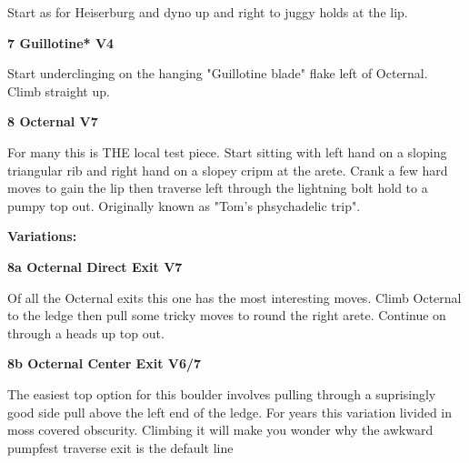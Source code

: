 \begin{multicols}{2}
\begin{adjustwidth}{0.5cm}{}
\begin{adjustwidth}{0.5cm}{}			
Start as for Heiserburg and dyno up and right to juggy holds at the lip.
\end{adjustwidth}


\end{adjustwidth}


\needspace{1.5cm}
\label{rt:Guillotine}
\colorbox{RoyalBlue!20}{
\parbox{0.95\linewidth}{
\textbf{
7 Guillotine* V4  
}}}

\begin{adjustwidth}{0.5cm}{}			
Start underclinging on the hanging "Guillotine blade" flake left of Octernal. Climb straight up.
\end{adjustwidth}



\needspace{1.5cm}
\label{rt:Octernal}
\colorbox{Goldenrod!50}{
\parbox{0.95\linewidth}{
\textbf{
8 Octernal V7  
}}}

\begin{adjustwidth}{0.5cm}{}			
For many this is THE local test piece. Start sitting with left hand on a sloping triangular rib and right hand on a slopey cripm at the arete. Crank a few hard moves to gain the lip then traverse left through the lightning bolt hold to a pumpy top out. Originally known as "Tom's phsychadelic trip".
\end{adjustwidth}

\begin{adjustwidth}{0.5cm}{}				
\needspace{3cm}
\textbf{Variations:} \newline

\needspace{1.5cm}
\label{vr:Octernal Direct Exit}
\colorbox{Goldenrod!50}{
\parbox{0.95\linewidth}{
\textbf{
8a Octernal Direct Exit V7  
}}}

\begin{adjustwidth}{0.5cm}{}			
Of all the Octernal exits this one has the most interesting moves. Climb Octernal to the ledge then pull some tricky moves to round the right arete. Continue on through a heads up top out.
\end{adjustwidth}



\needspace{1.5cm}
\label{vr:Octernal Center Exit}
\colorbox{Goldenrod!50}{
\parbox{0.95\linewidth}{
\textbf{
8b Octernal Center Exit V6/7  
}}}

\begin{adjustwidth}{0.5cm}{}			
The easiest top option for this boulder involves pulling through a suprisingly good side pull above the left end of the ledge. For years this variation livided in moss covered obscurity. Climbing it will make you wonder why the awkward pumpfest traverse exit is the default line
\end{adjustwidth}




\end{adjustwidth}
\end{multicols}
